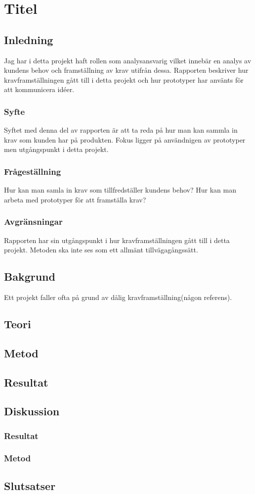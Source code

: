 \section{Titel}
\subsection{Inledning}
Jag har i detta projekt haft rollen som analysansvarig vilket innebär en analys av kundens behov och framställning av krav utifrån dessa. Rapporten beskriver hur kravframställningen gått till i detta projekt och hur prototyper har använts för att kommunicera idéer.
\subsubsection{Syfte}
Syftet med denna del av rapporten är att ta reda på hur man kan sammla in krav som kunden har på produkten. Fokus ligger på användnigen av prototyper men utgångspunkt i detta projekt.
\subsubsection{Frågeställning}
Hur kan man samla in krav som tillfredställer kundens behov?
Hur kan man arbeta med prototyper för att framställa krav?

\subsubsection{Avgränsningar}
Rapporten har sin utgångspunkt i hur kravframställningen gått till i detta projekt. Metoden ska inte ses som ett allmänt tillvägagångssätt.
\subsection{Bakgrund}
Ett projekt faller ofta på grund av dålig kravframställning(någon referens). 
\subsection{Teori}
\subsection{Metod}
\subsection{Resultat}
\subsection{Diskussion}
\subsubsection{Resultat}
\subsubsection{Metod}
\subsection{Slutsatser}
